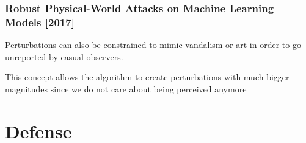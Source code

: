 \documentclass[9pt]{beamer}
\begin{document}
\begin{frame}
  \frametitle{Robust Physical-World Attacks on Machine Learning Models [2017]}

  Perturbations can also be constrained to mimic vandalism or art in
  order to go unreported by casual observers.

  \bigskip

  This concept allows the algorithm to create perturbations with much
  bigger magnitudes since we do not care about being perceived anymore

  \begin{center}
  \end{center}
\end{frame}

\section{Defense}
\end{document}
